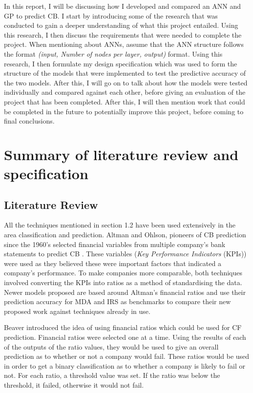 \documentclass[11pt]{article}
\begin{document}
In this report, I will be discussing how I developed and compared an ANN and GP to predict CB.  I start by introducing some of the research that was conducted to gain a deeper understanding of what this project entailed. Using this research, I then discuss the requirements that were needed to complete the project. When mentioning about ANNs, assume that the ANN structure follows the format \textit{(input, Number of nodes per layer, output)} format. Using this research, I then formulate my design specification which was used to form the structure of the models that were implemented to test the predictive accuracy of the two models. After this, I will go on to talk about how the models were tested individually and compared against each other, before giving an evaluation of the project that has been completed. After this, I will then mention work that could be completed in the future to potentially improve this project, before coming to final conclusions. 
\section{Summary of literature review and specification}\label{sec:spec}
\subsection{Literature Review}\label{subsec:litrev}
All the techniques mentioned in section 1.2 have been used extensively in the area classification and prediction. Altman and Ohlson, pioneers of CB prediction since the 1960's selected financial variables from multiple company's bank statements to predict CB \cite{ref-six,ref-eight}. These variables (\textit{Key Performance Indicators} (KPIs)) were used as they believed these were important factors that indicated a company's performance. To make companies more comparable, both techniques involved converting the KPIs into ratios as a method of standardising the data. Newer models proposed are based around Altman's financial ratios and use their prediction accuracy for MDA and IRS as benchmarks to compare their new proposed work against techniques already in use. 

Beaver introduced the idea of using financial ratios which could be used for CF prediction. Financial ratios were selected one at a time. Using the results of each of the outputs of the ratio values, they would be used to give an overall prediction as to whether or not a company would fail. These ratios would be used in order to get a binary classification as to whether a company is likely to fail or not. For each ratio, a threshold value was set. If the ratio was below the threshold, it failed, otherwise it would not fail.
\end{document}
